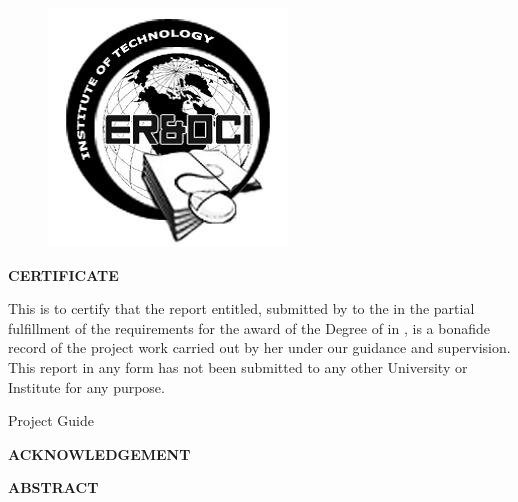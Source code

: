 \documentclass[12pt,a4paper]{report}
\begin{document}

\newpage
\thispagestyle{empty}
\begin{center}
{\insti{}}

\begin{figure}[ht]
\centering
\includegraphics[scale=0.5]{logo}
\end{figure}
{\large{\textbf{CERTIFICATE}}}

\end{center}

This is to certify that the report entitled,\textbf{ \projectname{}} submitted by \textbf{\stud{}} to the \uni{} in the partial fulfillment of the requirements for the award of the Degree of \degree{} in \stream{}, \depts{} is a bonafide record of the project work carried out by her under our guidance and supervision. This report in any form has not been submitted to any other University or Institute for any purpose.
\vspace{25mm}
 \\         
\begin{flushright} Project Guide \end{flushright} 
                                                                                     

\newpage
{}
\begin{center}
\textbf{ACKNOWLEDGEMENT}
\end{center} 

\newpage
\begin{center}
\textbf{ABSTRACT}
\end{center}  

	


\tableofcontents
\listoffigures
\newpage





\newpage

\newpage


 

\end{document}
